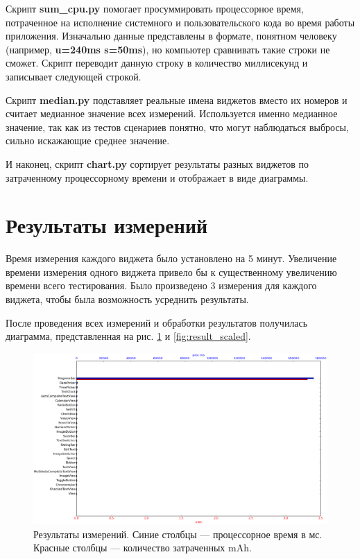 \documentclass[a4paper,14pt]{extarticle} %
\begin{document}
	Скрипт \textbf{sum\_cpu.py} помогает просуммировать процессорное время, потраченное на исполнение системного и пользовательского кода во время работы приложения. Изначально данные представлены в формате, понятном человеку (например, \textbf{u=240ms s=50ms}), но компьютер сравнивать такие строки не сможет. Скрипт переводит данную строку в количество миллисекунд и записывает следующей строкой.

	Скрипт \textbf{median.py} подставляет реальные имена виджетов вместо их номеров и считает медианное значение всех измерений. Используется именно медианное значение, так как из тестов сценариев понятно, что могут наблюдаться выбросы, сильно искажающие среднее значение. 
	
	И наконец, скрипт \textbf{chart.py} сортирует результаты разных виджетов по затраченному процессорному времени и отображает в виде диаграммы.
	
	\clearpage
	\section{Результаты измерений}
	
	Время измерения каждого виджета было установлено на 5 минут. Увеличение времени измерения одного виджета привело бы к существенному увеличению времени всего тестирования. Было произведено 3 измерения для каждого виджета, чтобы была возможность усреднить результаты.
	
	После проведения всех измерений и обработки результатов получилась диаграмма, представленная на рис. \ref{fig:result} и \ref{fig:result_scaled}.
	
	\begin{figure}[!htb]
		\includegraphics[width=\textwidth]{result}
		\caption{Результаты измерений. Синие столбцы --- процессорное время в мс. Красные столбцы --- количество затраченных mAh.}
		\label{fig:result}
	\end{figure}
\end{document}
